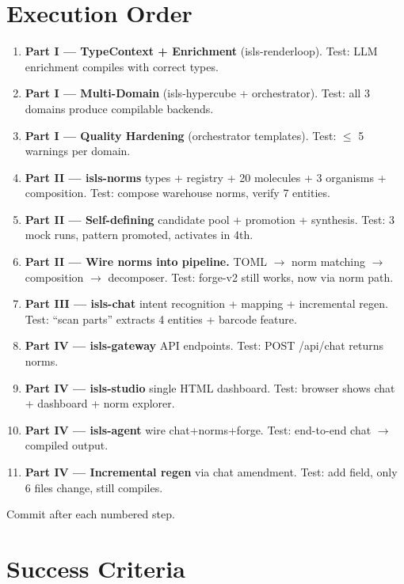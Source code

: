 \documentclass[11pt,a4paper]{article}
\begin{document}
\section{Execution Order}

\begin{enumerate}
\item \textbf{Part I --- TypeContext + Enrichment} (isls-renderloop).
  Test: LLM enrichment compiles with correct types.
\item \textbf{Part I --- Multi-Domain} (isls-hypercube + orchestrator).
  Test: all 3 domains produce compilable backends.
\item \textbf{Part I --- Quality Hardening} (orchestrator templates).
  Test: $\leq$ 5 warnings per domain.
\item \textbf{Part II --- isls-norms} types + registry + 20 molecules + 3 organisms + composition.
  Test: compose warehouse norms, verify 7 entities.
\item \textbf{Part II --- Self-defining} candidate pool + promotion + synthesis.
  Test: 3 mock runs, pattern promoted, activates in 4th.
\item \textbf{Part II --- Wire norms into pipeline.}
  TOML $\to$ norm matching $\to$ composition $\to$ decomposer.
  Test: forge-v2 still works, now via norm path.
\item \textbf{Part III --- isls-chat} intent recognition + mapping + incremental regen.
  Test: ``scan parts'' extracts 4 entities + barcode feature.
\item \textbf{Part IV --- isls-gateway} API endpoints.
  Test: POST /api/chat returns norms.
\item \textbf{Part IV --- isls-studio} single HTML dashboard.
  Test: browser shows chat + dashboard + norm explorer.
\item \textbf{Part IV --- isls-agent} wire chat+norms+forge.
  Test: end-to-end chat $\to$ compiled output.
\item \textbf{Part IV --- Incremental regen} via chat amendment.
  Test: add field, only 6 files change, still compiles.
\end{enumerate}

Commit after each numbered step.

\section{Success Criteria}
\end{document}
